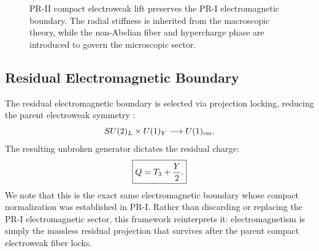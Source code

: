 \documentclass[11pt]{article}
\begin{document}
\begin{figure}[H]
\centering
{}
\caption{PR-II compact electroweak lift preserves the PR-I electromagnetic boundary. The radial stiffness is inherited from the macroscopic theory, while the non-Abelian fiber and hypercharge phase are introduced to govern the microscopic sector.}
\label{fig:pr1_to_pr2_lift}
\end{figure}

\subsection{Residual Electromagnetic Boundary}
\label{sec:pr2_residual_em_boundary}

The residual electromagnetic boundary is selected via projection locking, reducing the parent electroweak symmetry \cite{Higgs1964PRL, EnglertBrout1964}:
\begin{equation}
SU(2)_L
\times
U(1)_Y
\longrightarrow
U(1)_{\rm em}.
\end{equation}
The resulting unbroken generator dictates the residual charge:
\begin{equation}
\boxed{
\label{equ:residual_charge}
Q
=
T_3+\frac{Y}{2}.}
\end{equation}
We note that this is the exact same electromagnetic boundary whose compact normalization was established in PR-I. Rather than discarding or replacing the PR-I electromagnetic sector, this framework reinterprets it: electromagnetism is simply the massless residual projection that survives after the parent compact electroweak fiber locks.
\end{document}
